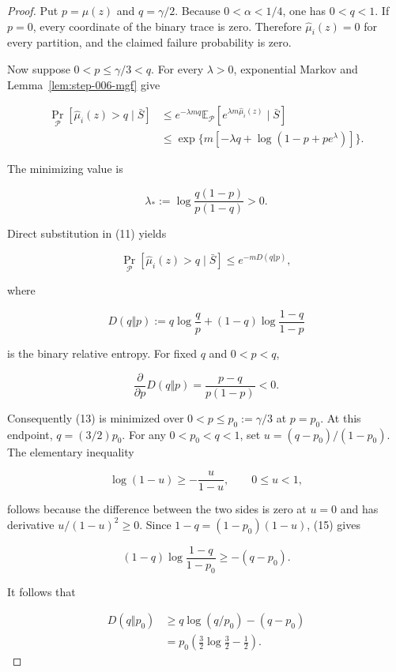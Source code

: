 \begin{proof}
Put \(p=\mu(z)\) and \(q=\gamma/2\).  Because
\(0<\alpha<1/4\), one has \(0<q<1\).  If \(p=0\), every coordinate of the
binary trace is zero.  Therefore \(\widehat\mu_i(z)=0\) for every partition,
and the claimed failure probability is zero.

Now suppose \(0<p\leq\gamma/3<q\).  For every \(\lambda>0\), exponential
Markov and Lemma~\ref{lem:step-006-mgf} give

\[
\begin{aligned}
 \Pr_{\mathcal P}[\widehat\mu_i(z)>q\mid\bar S]
 &\leq e^{-\lambda mq}
 \mathbb E_{\mathcal P}
 [e^{\lambda m\widehat\mu_i(z)}\mid\bar S]\\
 &\leq
 \exp\{m[-\lambda q+\log(1-p+pe^\lambda)]\}.
\end{aligned}
\tag{11}
\]

The minimizing value is

\[
 \lambda_*:=\log\frac{q(1-p)}{p(1-q)}>0.
\]

Direct substitution in (11) yields

\[
 \Pr_{\mathcal P}[\widehat\mu_i(z)>q\mid\bar S]
 \leq e^{-mD(q\Vert p)},
\tag{12}
\]

where

\[
 D(q\Vert p):=q\log\frac qp+(1-q)\log\frac{1-q}{1-p}
\tag{13}
\]

is the binary relative entropy.  For fixed \(q\) and \(0<p<q\),

\[
 \frac{\partial}{\partial p}D(q\Vert p)
 =\frac{p-q}{p(1-p)}<0.
\tag{14}
\]

Consequently (13) is minimized over
\(0<p\leq p_0:=\gamma/3\) at \(p=p_0\).  At this endpoint,
\(q=(3/2)p_0\).  For any \(0<p_0<q<1\), set
\(u=(q-p_0)/(1-p_0)\).  The elementary inequality

\[
 \log(1-u)\geq-\frac{u}{1-u},\qquad 0\leq u<1,
\tag{15}
\]

follows because the difference between the two sides is zero at \(u=0\)
and has derivative \(u/(1-u)^2\geq0\).  Since
\(1-q=(1-p_0)(1-u)\), (15) gives

\[
 (1-q)\log\frac{1-q}{1-p_0}\geq-(q-p_0).
\tag{16}
\]

It follows that

\[
\begin{aligned}
 D(q\Vert p_0)
 &\geq q\log(q/p_0)-(q-p_0)\\
 &=p_0\left(\frac32\log\frac32-\frac12\right).
\end{aligned}
\tag{17}
\]


\end{proof}

